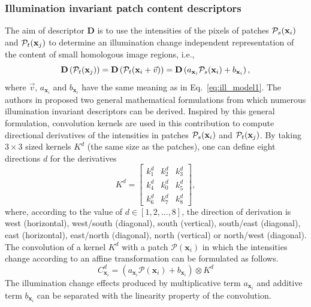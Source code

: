 \documentclass[a4paper,fleqn]{cas-dc}
\begin{document}
\subsubsection{Illumination invariant patch content descriptors}
%
The aim of descriptor $\mathbf{D}$ is to use the intensities of the pixels of patches $\mathcal{P}_s({\bf x}_i)$  and  $\mathcal{P}_t({\bf x}_j)$ to determine an illumination change independent representation of the content of small homologous image regions, i.e., 
%
\begin{equation} \label{eq:ill_model2}
\mathbf{D}\left(\mathcal{P}_t({\bf x}_j)\right) =  \mathbf{D}\left(\mathcal{P}_t({\bf x}_i+\vec{v})\right) =
\mathbf{D}\left(a_{\mathbf{x}_i} \mathcal{P}_s({\bf x}_i) + b_{\mathbf{x}_i}\right),
\end{equation}
%
where $\vec{v}$, $a_{\mathbf{x}_i}$ and $b_{\mathbf{x}_i}$ have the same meaning as in Eq.~\eqref{eq:ill_model1}.
%
The authors in \citep{Trinh_CVIU_2019} proposed two general mathematical formulations from which numerous illumination invariant descriptors can be derived. Inspired by this general formulation, convolution kernels are used in this contribution to compute directional derivatives of the intensities in patches $\mathcal{P}_s({\bf x}_i)$  and  $\mathcal{P}_t({\bf x}_j)$. By taking $3 \times 3$ sized kernels $K^d$ (the same size as the patches), one can define eight directions $d$ for the derivatives      
%
\begin{equation} \label{eq:ill_model3}
K^d = \left[
\begin{array}{ccc}
    k_1^d &  k_2^d & k_3^d\\
    k_4^d &  k_0 ^d & k_5^d\\
    k_6^d &  k_7 ^d & k_8^d
\end{array}\right],
\end{equation}
where, according to the value of $d \in [1, 2, \dots, 8]$, the direction of derivation is west (horizontal), west/south (diagonal), south (vertical), south/east (diagonal), east (horizontal), east/north (diagonal), north (vertical) or north/west (diagonal). 
%
The convolution of a kernel $K^d$ with a patch $\mathcal{P}({\mathbf{x}_i})$ in which the intensities change according to an affine transformation can be formulated as follows.   
%
\begin{equation} \label{eq:ill_model4}
C_{\mathbf{x}_i}^d = \left(a_{\mathbf{x}_i}\mathcal{P}(\mathbf{x}_i) + b_{\mathbf{x}_i}\right) \otimes K^d 
\end{equation}
%
The illumination change effects produced by multiplicative term $a_{\mathbf{x}_i}$ and additive term $b_{\mathbf{x}_i}$ can be separated with the linearity property of the convolution. 
\end{document}
